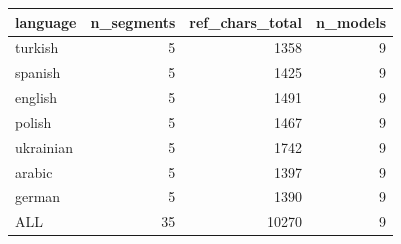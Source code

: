 \begin{tabular}{lrrr}
\toprule
language & n\_segments & ref\_chars\_total & n\_models \\
\midrule
turkish & 5 & 1358 & 9 \\
spanish & 5 & 1425 & 9 \\
english & 5 & 1491 & 9 \\
polish & 5 & 1467 & 9 \\
ukrainian & 5 & 1742 & 9 \\
arabic & 5 & 1397 & 9 \\
german & 5 & 1390 & 9 \\
ALL & 35 & 10270 & 9 \\
\bottomrule
\end{tabular}
